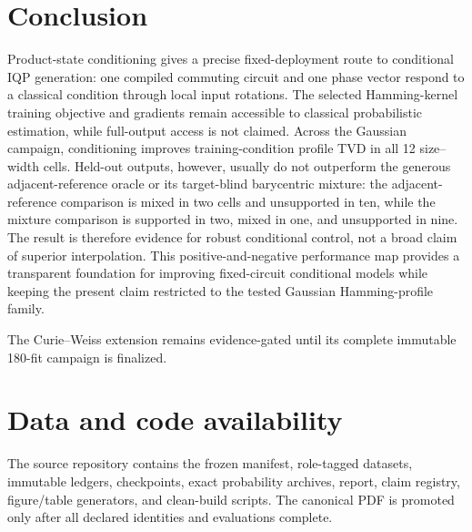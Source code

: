 \documentclass[a4paper,twocolumn,11pt,unpublished]{quantumarticle}
\newif\ifcurieweissancillaresults
\begin{document}
\section{Conclusion}

Product-state conditioning gives a precise fixed-deployment route to
conditional IQP generation: one compiled commuting circuit and one phase
vector respond to a classical condition through local input rotations.  The
selected Hamming-kernel training objective and gradients remain accessible to
classical probabilistic estimation, while full-output access is not claimed.
Across the Gaussian campaign, conditioning improves training-condition profile
TVD in all 12 size--width cells.  Held-out outputs, however, usually do not
outperform the generous adjacent-reference oracle or its target-blind
barycentric mixture: the adjacent-reference comparison is mixed in two cells and
unsupported in ten, while the mixture comparison is supported in two, mixed
in one, and unsupported in nine.  The result is therefore evidence for robust
conditional control, not a broad claim of superior interpolation.  This
positive-and-negative performance map provides a transparent foundation for
improving fixed-circuit conditional models while keeping the present claim
restricted to the tested Gaussian Hamming-profile family.
\ifcurieweissancillaresults
The eight-visible-qubit Curie--Weiss study extends that foundation from a
translated profile to a qualitative temperature response.  With nine
marginalized ancillas, conditioned-versus-no-condition effects are
\CWAncillaProfileControlHeldOut{} in held-out profile TVD and
\CWAncillaRawControlHeldOut{} in held-out raw TVD.  The complete rung ladder,
adjacent-reference comparisons, unseen critical point, and cold endpoint show
where this response does and does not translate into fidelity.  The result is
limited to this finite Curie--Weiss family and tested 17-qubit circuit; scaling
the visible system and separating latent capacity from parameter count are the
next empirical questions.
\else
The Curie--Weiss extension remains evidence-gated until its complete immutable
180-fit campaign is finalized.
\fi

\clearpage

\section*{Data and code availability}

The source repository contains the frozen manifest, role-tagged datasets,
immutable ledgers, checkpoints, exact probability archives, report, claim
registry, figure/table generators, and clean-build scripts.  The canonical PDF
is promoted only after all declared identities and evaluations complete.
\end{document}

